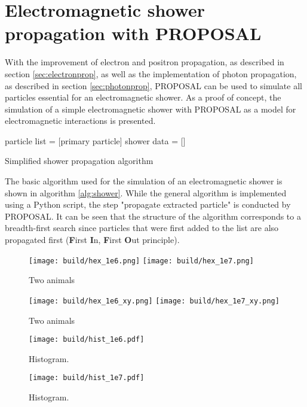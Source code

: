\section{Electromagnetic shower propagation with PROPOSAL}

With the improvement of electron and positron propagation, as described in section \ref{sec:electronprop}, as well as the implementation of photon propagation, as described in section \ref{sec:photonprop}, PROPOSAL can be used to simulate all particles essential for an electromagnetic shower.
As a proof of concept, the simulation of a simple electromagnetic shower with PROPOSAL as a model for electromagnetic interactions is presented.

\begin{algorithm}[H]
\DontPrintSemicolon
 particle list = [primary particle]\;
 shower data = [\:]\;
 \caption{Simplified shower propagation algorithm}
 \label{alg:shower}
\end{algorithm}

The basic algorithm used for the simulation of an electromagnetic shower is shown in algorithm \ref{alg:shower}.
While the general algorithm is implemented using a Python script, the step "propagate extracted particle" is conducted by PROPOSAL. 
It can be seen that the structure of the algorithm corresponds to a breadth-first search since particles that were first added to the list are also propagated first (\textbf{F}irst \textbf{I}n, \textbf{F}irst \textbf{O}ut principle).

\begin{figure}
      \centering
        {\texttt{[image: build/hex\_1e6.png]}}
        \hfill
        {\texttt{[image: build/hex\_1e7.png]}}
      \caption{Two animals}\label{animals}
\end{figure}

\begin{figure}
      \centering
        {\texttt{[image: build/hex\_1e6\_xy.png]}}
        \hfill
        {\texttt{[image: build/hex\_1e7\_xy.png]}}
      \caption{Two animals}\label{animals}
\end{figure}

\begin{figure}
    \centering
    \texttt{[image: build/hist\_1e6.pdf]}
    \caption{Histogram.}
    \label{fig:hist_1e6}
\end{figure}

\begin{figure}
    \centering
    \texttt{[image: build/hist\_1e7.pdf]}
    \caption{Histogram.}
    \label{fig:hist_1e7}
\end{figure}